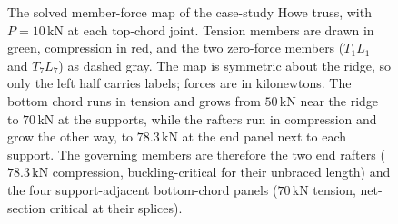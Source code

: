 \begin{figure}[htbp]
\caption[Solved member-force map of the case-study Howe truss]{The solved
member-force map of the case-study Howe truss, with $P=10\,\text{kN}$ at
each top-chord joint. Tension members are drawn in green, compression in
red, and the two zero-force members ($T_1L_1$ and $T_7L_7$) as dashed
gray. The map is symmetric about the ridge, so only the left half carries
labels; forces are in kilonewtons. The bottom chord runs in tension and
grows from $50\,\text{kN}$ near the ridge to $70\,\text{kN}$ at the
supports, while the rafters run in compression and grow the other way, to
$78.3\,\text{kN}$ at the end panel next to each support. The governing
members are therefore the two end rafters ($78.3\,\text{kN}$ compression,
buckling-critical for their unbraced length) and the four support-adjacent
bottom-chord panels ($70\,\text{kN}$ tension, net-section critical at
their splices).}
\label{fig:vol03ch02:howe-force-map}
\end{figure}
